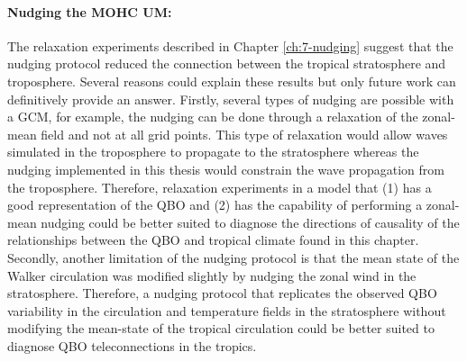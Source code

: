 \paragraph{Nudging the MOHC UM:} 
The relaxation experiments described in Chapter \ref{ch:7-nudging} suggest that the nudging protocol reduced the connection between the tropical stratosphere and troposphere. 
Several reasons could explain these results but only future work can definitively provide an answer. 
Firstly, several types of nudging are possible with a GCM, for example, the nudging can be done through a relaxation of the zonal-mean field and not at all grid points. 
This type of relaxation would allow waves simulated in the troposphere to propagate to the stratosphere whereas the nudging implemented in this thesis would constrain the wave propagation from the troposphere. 
Therefore, relaxation experiments in a model that (1) has a good representation of the QBO and (2) has the capability of performing a zonal-mean nudging could be better suited to diagnose the directions of causality of the relationships between the QBO and tropical climate found in this chapter.
\\
Secondly, another limitation of the nudging protocol is that the mean state of the Walker circulation was modified slightly by nudging the zonal wind in the stratosphere.
Therefore, a nudging protocol that replicates the observed QBO variability in the circulation and temperature fields in the stratosphere without modifying the mean-state of the tropical circulation could be better suited to diagnose QBO teleconnections in the tropics.

 




